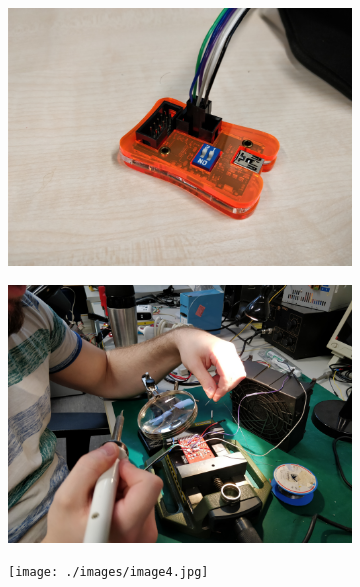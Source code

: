 \begin{figure}
	\begin{subfigure}{.5\textwidth}
		\centering
		\includegraphics[width=.8\linewidth]{./images/image3.jpg}
	\end{subfigure}%
	\begin{subfigure}{.5\textwidth}
		\centering
		\includegraphics[width=.8\linewidth]{./images/image6.jpg}
	\end{subfigure}
	\begin{subfigure}{.5\textwidth}
		\centering
		\texttt{[image: ./images/image4.jpg]}
	\end{subfigure}%
	\begin{subfigure}{.5\textwidth}
		\centering

\end{subfigure}
\end{figure}
